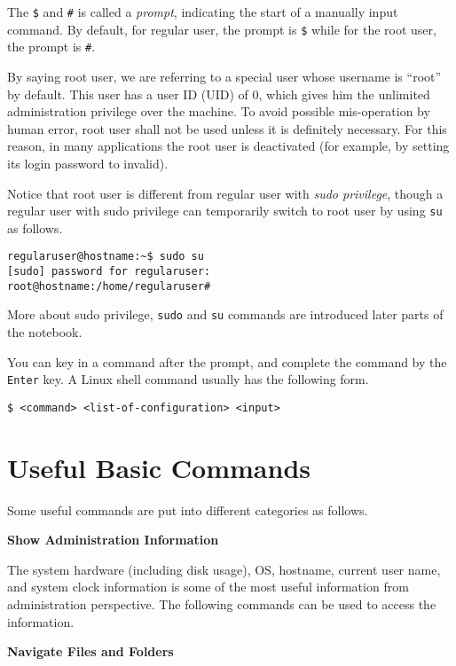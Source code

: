 The \verb|$| and \verb|#| is called a \textit{prompt}, indicating the start of a manually input command. By default, for regular user, the prompt is \verb|$| while for the root user, the prompt is \verb|#|.

By saying root user, we are referring to a special user whose username is ``root'' by default. This user has a user ID (UID) of $0$, which gives him the unlimited administration privilege over the machine. To avoid possible mis-operation by human error, root user shall not be used unless it is definitely necessary. For this reason, in many applications the root user is deactivated (for example, by setting its login password to invalid).

Notice that root user is different from regular user with \textit{sudo privilege}, though a regular user with sudo privilege can temporarily switch to root user by using \verb|su| as follows.
\begin{verbatim}
regularuser@hostname:~$ sudo su
[sudo] password for regularuser:
root@hostname:/home/regularuser#
\end{verbatim}

More about sudo privilege, \verb|sudo| and \verb|su| commands are introduced later parts of the notebook.

You can key in a command after the prompt, and complete the command by the \verb|Enter| key. A Linux shell command usually has the following form.
\begin{verbatim}
$ <command> <list-of-configuration> <input>
\end{verbatim}


\section{Useful Basic Commands}

Some useful commands are put into different categories as follows.

\vspace{0.1in}
\noindent \textbf{Show Administration Information}
\vspace{0.1in}

The system hardware (including disk usage), OS, hostname, current user name, and system clock information is some of the most useful information from administration perspective. The following commands can be used to access the information.

 



\vspace{0.1in}
\noindent \textbf{Navigate Files and Folders}
\vspace{0.1in}



